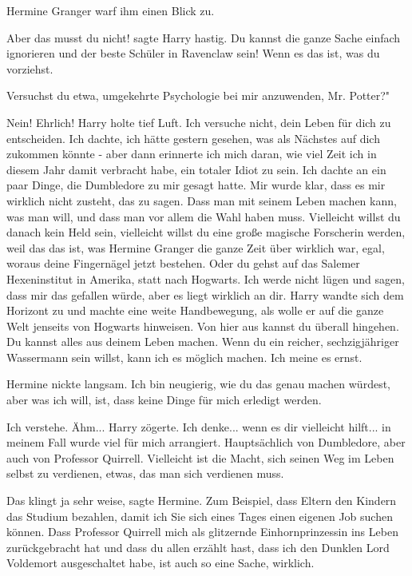 Hermine Granger warf ihm einen Blick zu.

\glqq Aber das musst du nicht!\grqq{} sagte Harry hastig. \glqq Du kannst die
ganze Sache einfach ignorieren und der beste Schüler in Ravenclaw sein! Wenn es
das ist, was du vorziehst.\grqq{}

\glqq Versuchst du etwa, umgekehrte Psychologie bei mir anzuwenden, Mr. Potter?"

\glqq Nein! Ehrlich!\grqq{} Harry holte tief Luft. \glqq Ich versuche nicht,
dein Leben für dich zu entscheiden. Ich dachte, ich hätte gestern gesehen, was
als Nächstes auf dich zukommen könnte - aber dann erinnerte ich mich daran, wie
viel Zeit ich in diesem Jahr damit verbracht habe, ein totaler Idiot zu sein.
Ich dachte an ein paar Dinge, die Dumbledore zu mir gesagt hatte. Mir wurde
klar, dass es mir wirklich nicht zusteht, das zu sagen. Dass man mit seinem
Leben machen kann, was man will, und dass man vor allem die Wahl haben muss.
Vielleicht willst du danach kein Held sein, vielleicht willst du eine große
magische Forscherin werden, weil das das ist, was Hermine Granger die ganze Zeit
über wirklich war, egal, woraus deine Fingernägel jetzt bestehen. Oder du gehst
auf das Salemer Hexeninstitut in Amerika, statt nach Hogwarts. Ich werde nicht
lügen und sagen, dass mir das gefallen würde, aber es liegt wirklich an
dir.\grqq{} Harry wandte sich dem Horizont zu und machte eine weite
Handbewegung, als wolle er auf die ganze Welt jenseits von Hogwarts hinweisen.
\glqq Von hier aus kannst du überall hingehen. Du kannst alles aus deinem Leben
machen. Wenn du ein reicher, sechzigjähriger Wassermann sein willst, kann ich es
möglich machen. Ich meine es ernst.\grqq{}

Hermine nickte langsam. \glqq Ich bin neugierig, wie du das genau machen
würdest, aber was ich will, ist, dass keine Dinge für mich erledigt
werden.\grqq{}

\glqq Ich verstehe. Ähm...\grqq{} Harry zögerte. \glqq Ich denke... wenn es dir
vielleicht hilft... in meinem Fall wurde viel für mich arrangiert. Hauptsächlich
von Dumbledore, aber auch von Professor Quirrell. Vielleicht ist die Macht, sich
seinen Weg im Leben selbst zu verdienen, etwas, das man sich verdienen
muss.\grqq{}

\glqq Das klingt ja sehr weise\grqq{}, sagte Hermine. \glqq Zum Beispiel, dass
Eltern den Kindern das Studium bezahlen, damit ich Sie sich eines Tages einen
eigenen Job suchen können. Dass Professor Quirrell mich als glitzernde
Einhornprinzessin ins Leben zurückgebracht hat und dass du allen erzählt hast,
dass ich den Dunklen Lord Voldemort ausgeschaltet habe, ist auch so eine Sache,
wirklich.\grqq{}

